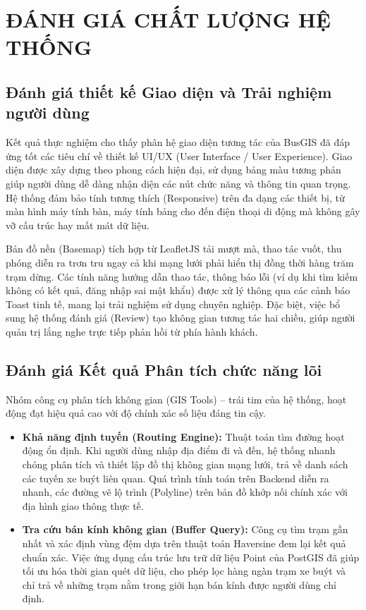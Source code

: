 \chapter{ĐÁNH GIÁ CHẤT LƯỢNG HỆ THỐNG}

\section{Đánh giá thiết kế Giao diện và Trải nghiệm người dùng}

Kết quả thực nghiệm cho thấy phân hệ giao diện tương tác của BusGIS đã đáp ứng tốt các tiêu chí về thiết kế UI/UX (User Interface / User Experience). Giao diện được xây dựng theo phong cách hiện đại, sử dụng bảng màu tương phản giúp người dùng dễ dàng nhận diện các nút chức năng và thông tin quan trọng. Hệ thống đảm bảo tính tương thích (Responsive) trên đa dạng các thiết bị, từ màn hình máy tính bàn, máy tính bảng cho đến điện thoại di động mà không gây vỡ cấu trúc hay mất mát dữ liệu. 

Bản đồ nền (Basemap) tích hợp từ LeafletJS tải mượt mà, thao tác vuốt, thu phóng diễn ra trơn tru ngay cả khi mạng lưới phải hiển thị đồng thời hàng trăm trạm dừng. Các tính năng hướng dẫn thao tác, thông báo lỗi (ví dụ khi tìm kiếm không có kết quả, đăng nhập sai mật khẩu) được xử lý thông qua các cảnh báo Toast tinh tế, mang lại trải nghiệm sử dụng chuyên nghiệp. Đặc biệt, việc bổ sung hệ thống đánh giá (Review) tạo không gian tương tác hai chiều, giúp người quản trị lắng nghe trực tiếp phản hồi từ phía hành khách.

\section{Đánh giá Kết quả Phân tích chức năng lõi}

Nhóm công cụ phân tích không gian (GIS Tools) – trái tim của hệ thống, hoạt động đạt hiệu quả cao với độ chính xác số liệu đáng tin cậy.

\begin{itemize}
    \item \textbf{Khả năng định tuyến (Routing Engine):} Thuật toán tìm đường hoạt động ổn định. Khi người dùng nhập địa điểm đi và đến, hệ thống nhanh chóng phân tích và thiết lập đồ thị không gian mạng lưới, trả về danh sách các tuyến xe buýt liên quan. Quá trình tính toán trên Backend diễn ra nhanh, các đường vẽ lộ trình (Polyline) trên bản đồ khớp nối chính xác với địa hình giao thông thực tế.
    \item \textbf{Tra cứu bán kính không gian (Buffer Query):} Công cụ tìm trạm gần nhất và xác định vùng đệm dựa trên thuật toán Haversine đem lại kết quả chuẩn xác. Việc ứng dụng cấu trúc lưu trữ dữ liệu Point của PostGIS đã giúp tối ưu hóa thời gian quét dữ liệu, cho phép lọc hàng ngàn trạm xe buýt và chỉ trả về những trạm nằm trong giới hạn bán kính được người dùng chỉ định.
\end{itemize}

